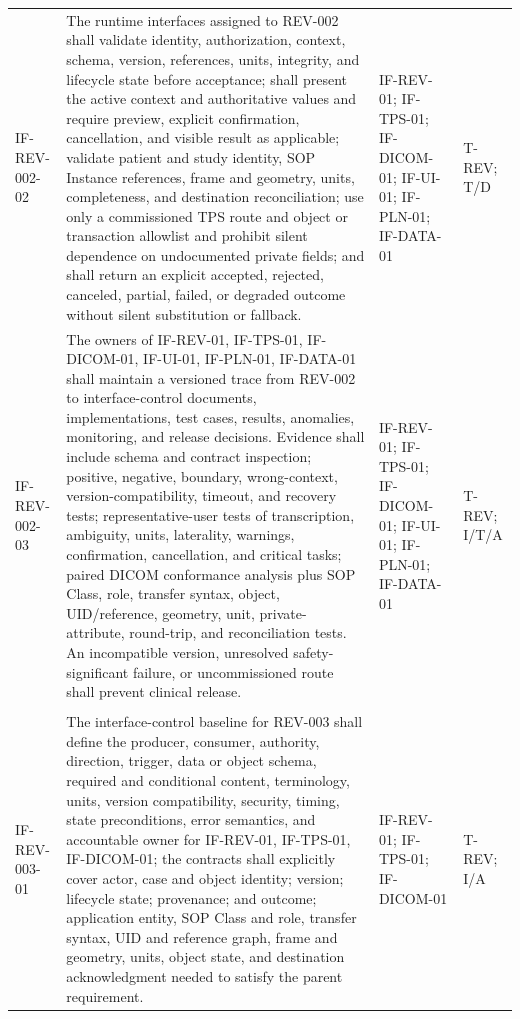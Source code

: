 \documentclass[11pt,letterpaper]{article}
\begin{document}
\begin{scriptsize}
\begin{longtable}{@{}L{0.14\textwidth}L{0.49\textwidth}L{0.19\textwidth}L{0.10\textwidth}@{}}
\mbox{IF-REV-002-02} & The runtime interfaces assigned to REV-002 shall validate identity, authorization, context, schema, version, references, units, integrity, and lifecycle state before acceptance; shall present the active context and authoritative values and require preview, explicit confirmation, cancellation, and visible result as applicable; validate patient and study identity, SOP Instance references, frame and geometry, units, completeness, and destination reconciliation; use only a commissioned TPS route and object or transaction allowlist and prohibit silent dependence on undocumented private fields; and shall return an explicit accepted, rejected, canceled, partial, failed, or degraded outcome without silent substitution or fallback. & IF-REV-01; IF-TPS-01; IF-DICOM-01; IF-UI-01; IF-PLN-01; IF-DATA-01 & T-REV; T\slash\allowbreak{}D \\
\addlinespace[2pt]
\mbox{IF-REV-002-03} & The owners of IF-REV-01, IF-TPS-01, IF-DICOM-01, IF-UI-01, IF-PLN-01, IF-DATA-01 shall maintain a versioned trace from REV-002 to interface-control documents, implementations, test cases, results, anomalies, monitoring, and release decisions. Evidence shall include schema and contract inspection; positive, negative, boundary, wrong-context, version-compatibility, timeout, and recovery tests; representative-user tests of transcription, ambiguity, units, laterality, warnings, confirmation, cancellation, and critical tasks; paired DICOM conformance analysis plus SOP Class, role, transfer syntax, object, UID\slash\allowbreak{}reference, geometry, unit, private-attribute, round-trip, and reconciliation tests. An incompatible version, unresolved safety-significant failure, or uncommissioned route shall prevent clinical release. & IF-REV-01; IF-TPS-01; IF-DICOM-01; IF-UI-01; IF-PLN-01; IF-DATA-01 & T-REV; I\slash\allowbreak{}T\slash\allowbreak{}A \\
\addlinespace[2pt]
 \\
\addlinespace[2pt]
\mbox{IF-REV-003-01} & The interface-control baseline for REV-003 shall define the producer, consumer, authority, direction, trigger, data or object schema, required and conditional content, terminology, units, version compatibility, security, timing, state preconditions, error semantics, and accountable owner for IF-REV-01, IF-TPS-01, IF-DICOM-01; the contracts shall explicitly cover actor, case and object identity; version; lifecycle state; provenance; and outcome; application entity, SOP Class and role, transfer syntax, UID and reference graph, frame and geometry, units, object state, and destination acknowledgment needed to satisfy the parent requirement. & IF-REV-01; IF-TPS-01; IF-DICOM-01 & T-REV; I\slash\allowbreak{}A \\

\end{longtable}
\end{scriptsize}
\end{document}
